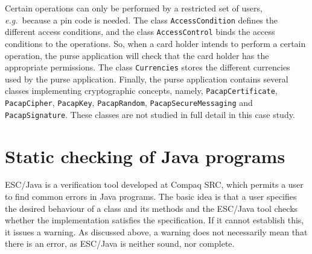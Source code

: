 \documentclass[a4paper]{llncs}
\begin{document}

Certain operations can only be performed by a restricted set of users,
\emph{e.g.}~because a pin code is needed.
The class \texttt{AccessCondition} defines the different access
conditions, and the class \texttt{AccessControl} binds the access conditions
to the operations. So, when a card holder intends to perform a certain
operation, the purse application will check that the card holder has
the appropriate permissions. %
The class \texttt{Currencies} stores the different currencies used by
the purse application.  Finally, the purse application contains several classes
implementing cryptographic concepts, namely, \texttt{PacapCertificate},
\texttt{PacapCipher}, \texttt{PacapKey}, \texttt{PacapRandom},
\texttt{PacapSecureMessaging} and \texttt{PacapSignature}. These
classes are not studied in full detail in this case study.






\section{Static checking of Java programs}
\label{SectStatic}


\label{SubSectEscJava}

ESC/Java is a verification tool developed at Compaq SRC, which permits 
a user
to find common errors in Java programs. The basic idea is that a user
specifies the desired behaviour of a class and its methods and
the ESC/Java tool checks whether the implementation satisfies the
specification. If it cannot establish this, it issues a warning. As
discussed above, a warning does not necessarily mean that there is an error,
as ESC/Java is neither sound, nor complete.
\end{document}
